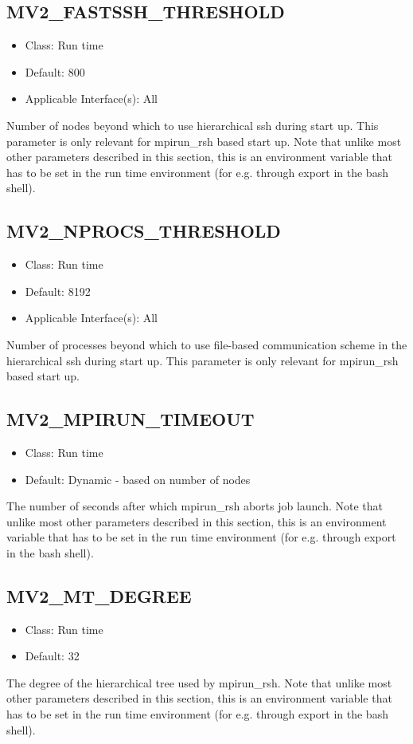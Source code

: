 \subsection{MV2\_FASTSSH\_THRESHOLD}
\label{def:mv2_fastssh_threshold}
\begin{itemize}
    \item Class: Run time
    \item Default: 800
	\item Applicable Interface(s): All
\end{itemize}
Number of nodes beyond which to use hierarchical ssh during start up. This
parameter is only relevant for mpirun\_rsh based start up. Note that unlike most
other parameters described in this section, this is an environment variable that
has to be set in the run time environment (for e.g. through export in the bash
shell). 

\subsection{MV2\_NPROCS\_THRESHOLD}
\label{def:mv2_nprocs_threshold}
\begin{itemize}
    \item Class: Run time
    \item Default: 8192
	\item Applicable Interface(s): All
\end{itemize}
Number of processes beyond which to use file-based communication scheme in the hierarchical ssh during start up. This
parameter is only relevant for mpirun\_rsh based start up.

\subsection{MV2\_MPIRUN\_TIMEOUT}
\label{def:mpirun-timeout}
\begin{itemize}
    \item Class: Run time
    \item Default: Dynamic - based on number of nodes
\end{itemize}
The number of seconds after which mpirun\_rsh aborts job launch. Note that unlike most other parameters described in this section, this is an environment variable that has to be set in the run time environment (for e.g. through export in the bash shell).

\subsection{MV2\_MT\_DEGREE}
\label{def:mt-degree}
\begin{itemize}
    \item Class: Run time
    \item Default: 32
\end{itemize}
The degree of the hierarchical tree used by mpirun\_rsh. Note that unlike most other parameters described in this section, this is an environment variable that has to be set in the run time environment (for e.g. through export in the bash shell).

